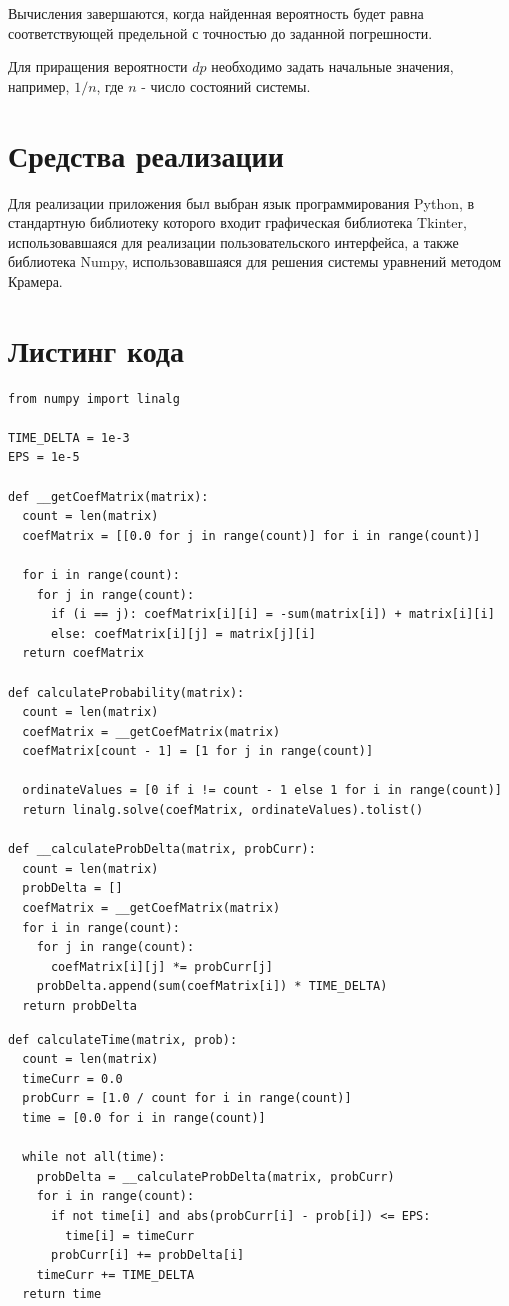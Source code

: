 \documentclass[12pt]{report}
\begin{document}
Вычисления завершаются, когда найденная вероятность будет равна соответствующей предельной с точностью до заданной погрешности.
\newline


Для приращения вероятности $dp$ необходимо задать начальные значения, например, $1/n$, где $n$ - число состояний системы.

\section*{Средства реализации}

Для реализации приложения был выбран язык программирования Python, в стандартную библиотеку которого входит графическая библиотека Tkinter, использовавшаяся для реализации пользовательского интерфейса, а также библиотека Numpy, использовавшаяся для решения системы уравнений методом Крамера.

\section*{Листинг кода}

\begin{lstlisting}
from numpy import linalg

TIME_DELTA = 1e-3
EPS = 1e-5

def __getCoefMatrix(matrix):
  count = len(matrix)
  coefMatrix = [[0.0 for j in range(count)] for i in range(count)]

  for i in range(count):
    for j in range(count):
      if (i == j): coefMatrix[i][i] = -sum(matrix[i]) + matrix[i][i] 
      else: coefMatrix[i][j] = matrix[j][i]
  return coefMatrix

def calculateProbability(matrix):
  count = len(matrix)
  coefMatrix = __getCoefMatrix(matrix)
  coefMatrix[count - 1] = [1 for j in range(count)]

  ordinateValues = [0 if i != count - 1 else 1 for i in range(count)]
  return linalg.solve(coefMatrix, ordinateValues).tolist()

def __calculateProbDelta(matrix, probCurr):
  count = len(matrix)
  probDelta = []
  coefMatrix = __getCoefMatrix(matrix)
  for i in range(count):
    for j in range(count):
      coefMatrix[i][j] *= probCurr[j]
    probDelta.append(sum(coefMatrix[i]) * TIME_DELTA)
  return probDelta
\end{lstlisting}
\clearpage
\begin{lstlisting}
def calculateTime(matrix, prob):
  count = len(matrix)
  timeCurr = 0.0
  probCurr = [1.0 / count for i in range(count)]
  time = [0.0 for i in range(count)]
  
  while not all(time):
    probDelta = __calculateProbDelta(matrix, probCurr)
    for i in range(count):
      if not time[i] and abs(probCurr[i] - prob[i]) <= EPS:
        time[i] = timeCurr
      probCurr[i] += probDelta[i]
    timeCurr += TIME_DELTA
  return time
\end{lstlisting}
\end{document}
